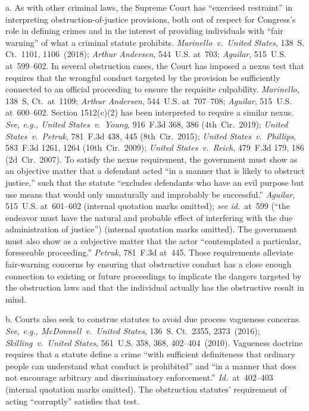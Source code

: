 a. As with other criminal laws, the Supreme Court has ``exercised restraint'' in interpreting obstruction-of-justice provisions, both out of respect for Congress's role in defining crimes and in the interest of providing individuals with ``fair warning'' of what a criminal statute prohibits.
\textit{Marinello~v.\ United States}, 138~S. Ct.~1101, 1106~(2018);
\textit{Arthur Andersen}, 544~U.S. at~703;
\textit{Aguilar}, 515~U.S. at~599--602.
In several obstruction cases, the Court has imposed a nexus test that requires that the wrongful conduct targeted by the provision be sufficiently connected to an official proceeding to ensure the requisite culpability.
\textit{Marinello}, 138~S, Ct.~at~1109;
\textit{Arthur Andersen}, 544~U.S. at~707--708;
\textit{Aguilar}, 515~U.S. at~600--602.
Section 1512(c)(2) has been interpreted to require a similar nexus.
\textit{See, e.g., United States~v.\ Young}, 916~F.3d 368, 386 (4th~Cir.~2019);
\textit{United States~v.\ Petruk}, 781~F.3d 438, 445 (8th~Cir.~2015);
\textit{United States~v.\ Phillips}, 583~F.3d 1261, 1264 (10th~Cir.~2009);
\textit{United States~v.\ Reich}, 479~F.3d 179, 186 (2d~Cir.~2007).
To satisfy the nexus requirement, the government must show as an objective matter that a defendant acted ``in a manner that is likely to obstruct justice,'' such that the statute ``excludes defendants who have an evil purpose but use means that would only unnaturally and improbably be successful.''
\textit{Aguilar}, 515~U.S. at~601--602 (internal quotation marks omitted);
\textit{see id.}~at~599 (``the endeavor must have the natural and probable effect of interfering with the due administration of justice'') (internal quotation marks omitted).
The government must also show as a subjective matter that the actor ``contemplated a particular, foreseeable proceeding.''
\textit{Petruk}, 781~F.3d at~445.
Those requirements alleviate fair-warning concerns by ensuring that obstructive conduct has a close enough connection to existing or future proceedings to implicate the dangers targeted by the obstruction laws and that the individual actually has the obstructive result in mind.

b. Courts also seek to construe statutes to avoid due process vagueness concerns.
\textit{See, e.g., McDonnell~v.\ United States}, 136~S. Ct.~2355, 2373~(2016);
\textit{Skilling~v.\ United States}, 561~U.S. 358, 368, 402--404~(2010).
Vagueness doctrine requires that a statute define a crime ``with sufficient definiteness that ordinary people can understand what conduct is prohibited'' and ``in a manner that does not encourage arbitrary and discriminatory enforcement.''
\textit{Id.}~at~402--403 (internal quotation marks omitted).
The obstruction statutes' requirement of acting ``corruptly'' satisfies that test.

